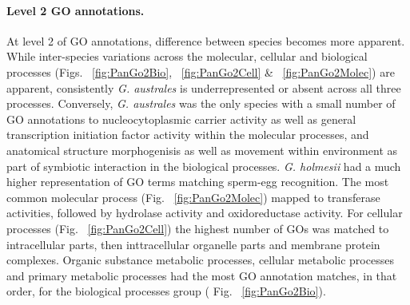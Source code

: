 \documentclass[12pt]{article}
\begin{document}
\paragraph{Level 2 GO annotations.}
\FloatBarrier
At level 2 of GO annotations, difference between species becomes more apparent. 
While inter-species variations across the molecular, cellular and biological processes (Figs. ~\ref{fig:PanGo2Bio}, ~\ref{fig:PanGo2Cell} \& ~\ref{fig:PanGo2Molec}) are apparent, consistently \textit{G. australes} is underrepresented or absent across all three processes. 
Conversely, \textit{G. australes} was the only species with a small number of GO annotations to nucleocytoplasmic carrier activity as well as general transcription initiation factor activity within the molecular processes, and anatomical structure morphogenisis as well as movement within environment as part of symbiotic interaction in the biological processes. 
\textit{G. holmesii} had a much higher representation of GO terms matching sperm-egg recognition. 
The most common molecular process (Fig. ~\ref{fig:PanGo2Molec}) mapped to transferase activities, followed by hydrolase activity and oxidoreductase activity. 
For cellular processes (Fig. ~\ref{fig:PanGo2Cell}) the highest number of GOs was matched to intracellular parts, then inttracellular organelle parts and membrane protein complexes. 
Organic substance metabolic processes, cellular metabolic processes and primary metabolic processes had the most GO annotation matches, in that order, for the biological processes group ( Fig. ~\ref{fig:PanGo2Bio}). 
\end{document}
